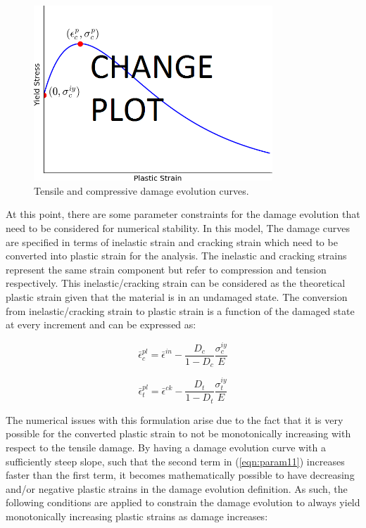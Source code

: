\begin{figure}[!htb]
\begin{center}
\includegraphics[width=0.8\textwidth]{figures/Chapter3/DamageCurves}
\caption{{\label{fig:damageCurves} Tensile and compressive damage evolution curves.%
}}
\end{center}
\end{figure}

At this point, there are some parameter constraints for the damage evolution that need to be considered for numerical stability. In this model, The damage curves are specified in terms of inelastic strain and cracking strain which need to be converted into plastic strain for the analysis. The inelastic and cracking strains represent the same strain component but refer to compression and tension respectively. This inelastic/cracking strain can be considered as the theoretical plastic strain given that the material is in an undamaged state. The conversion from inelastic/cracking strain to plastic strain is a function of the damaged state at every increment and can be expressed as:

\begin{equation}
\label{eqn:param11}
\bar{\epsilon}_{c}^{pl}=\bar{\epsilon}^{in}-\frac{D_{c}}{1-D_{c}}\frac{\sigma_{c}^{iy}}{E}
\end{equation}

\begin{equation}
\label{eqn:param11-1}
\bar{\epsilon}_{t}^{pl}=\bar{\epsilon}^{ck}-\frac{D_{t}}{1-D_{t}}\frac{\sigma_{t}^{iy}}{E}
\end{equation}

The numerical issues with this formulation arise due to the fact that it is very possible for the converted plastic strain to not be monotonically increasing with respect to the tensile damage. By having a damage evolution curve with a sufficiently steep slope, such that the second term in (\ref{eqn:param11}) increases faster than the first term, it becomes mathematically possible to have decreasing and/or negative plastic strains in the damage evolution definition. As such, the following conditions are applied to constrain the damage evolution to always yield monotonically increasing plastic strains as damage increases:


